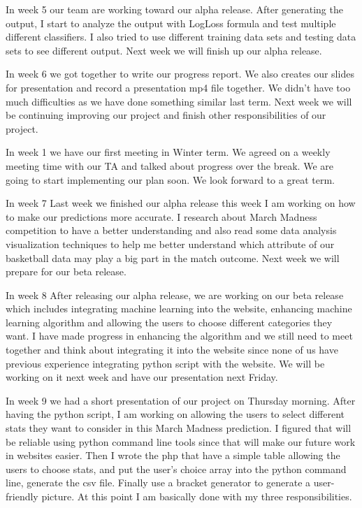 \documentclass[letterpaper, 10pt,titlepage]{article}
\begin{document}
\par In week 5 our team are working toward our alpha release. After generating the output, I start to analyze the output with LogLoss formula and test multiple different classifiers. I also tried to use different training data sets and testing data sets to see different output. Next week we will finish up our alpha release.

\par In week 6 we got together to write our progress report. We also creates our slides for presentation and record a presentation mp4 file together. We didn't have too much difficulties as we have done something similar last term. Next week we will be continuing improving our project and finish other responsibilities of our project.\par In week 1 we have our first meeting in Winter term. We agreed on a weekly meeting time with our TA and talked about progress over the break. We are going to start implementing our plan soon. We look forward to a great term.

\par In week 7 Last week we finished our alpha release this week I am working on how to make our predictions more accurate. I research about March Madness competition to have a better understanding and also read some data analysis visualization techniques to help me better understand which attribute of our basketball data may play a big part in the match outcome. Next week we will prepare for our beta release.


\par In week 8 After releasing our alpha release, we are working on our beta release which includes integrating machine learning into the website, enhancing machine learning algorithm and allowing the users to choose different categories they want. I have made progress in enhancing the algorithm and we still need to meet together and think about integrating it into the website since none of us have previous experience integrating python script with the website. We will be working on it next week and have our presentation next Friday.

\par In week 9 we had a short presentation of our project on Thursday morning. After having the python script, I am working on allowing the users to select different stats they want to consider in this March Madness prediction. I figured that will be reliable using python command line tools since that will make our future work in websites easier. Then I wrote the php that have a simple table allowing the users to choose stats, and put the user's choice array into the python command line, generate the csv file. Finally use a bracket generator to generate a user-friendly picture. At this point I am basically done with my three responsibilities.
\end{document}
